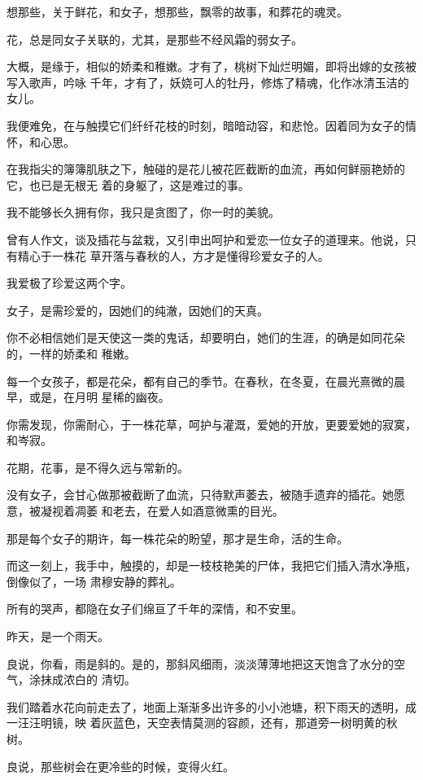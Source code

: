 		想那些，关于鲜花，和女子，想那些，飘零的故事，和葬花的魂灵。

		花，总是同女子关联的，尤其，是那些不经风霜的弱女子。

		大概，是缘于，相似的娇柔和稚嫩。才有了，桃树下灿烂明媚，即将出嫁的女孩被写入歌声，吟咏
	千年，才有了，妖娆可人的牡丹，修炼了精魂，化作冰清玉洁的女儿。

		我便难免，在与触摸它们纤纤花枝的时刻，暗暗动容，和悲怆。因着同为女子的情怀，和心思。

		在我指尖的簿簿肌肤之下，触碰的是花儿被花匠截断的血流，再如何鲜丽艳娇的它，也已是无根无
	着的身躯了，这是难过的事。

		我不能够长久拥有你，我只是贪图了，你一时的美貌。


		\vspace{1em}
		曾有人作文，谈及插花与盆栽，又引申出呵护和爱恋一位女子的道理来。他说，只有精心于一株花
	草开落与春秋的人，方才是懂得珍爱女子的人。

		我爱极了珍爱这两个字。

		女子，是需珍爱的，因她们的纯澈，因她们的天真。

		你不必相信她们是天使这一类的鬼话，却要明白，她们的生涯，的确是如同花朵的，一样的娇柔和
	稚嫩。

		每一个女孩子，都是花朵，都有自己的季节。在春秋，在冬夏，在晨光熹微的晨早，或是，在月明
	星稀的幽夜。

		你需发现，你需耐心，于一株花草，呵护与灌溉，爱她的开放，更要爱她的寂寞，和岑寂。

		花期，花事，是不得久远与常新的。

		没有女子，会甘心做那被截断了血流，只待默声萎去，被随手遗弃的插花。她愿意，被凝视着凋萎
	和老去，在爱人如酒意微熏的目光。

		那是每个女子的期许，每一株花朵的盼望，那才是生命，活的生命。

		而这一刻上，我手中，触摸的，却是一枝枝艳美的尸体，我把它们插入清水净瓶，倒像似了，一场
	肃穆安静的葬礼。

		所有的哭声，都隐在女子们绵亘了千年的深情，和不安里。

		\vspace{1em}
		昨天，是一个雨天。

		良说，你看，雨是斜的。是的，那斜风细雨，淡淡薄薄地把这天饱含了水分的空气，涂抹成浓白的
	清切。

		我们踏着水花向前走去了，地面上渐渐多出许多的小小池塘，积下雨天的透明，成一汪汪明镜，映
	着灰蓝色，天空表情莫测的容颜，还有，那道旁一树明黄的秋树。

		良说，那些树会在更冷些的时候，变得火红。

